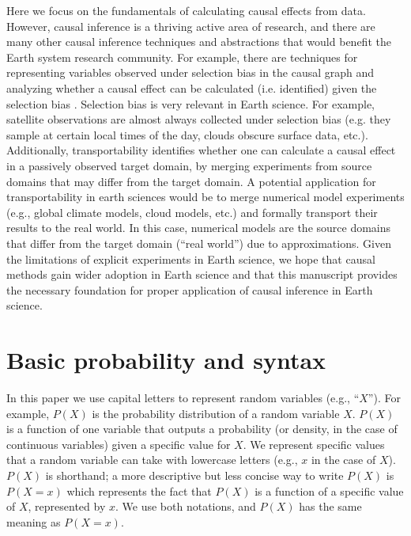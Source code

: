\documentclass[12pt]{article}
\begin{document}
Here we focus on the fundamentals of calculating causal effects from
data. However, causal inference is a thriving active area of research,
and there are many other causal inference techniques and abstractions
that would benefit the Earth system research community. For example,
there are techniques for representing variables observed under
selection bias in the causal graph and analyzing whether a causal
effect can be calculated (i.e. identified) given the selection bias
\citep[e.g.,][]{bareinboim2014recovering}. Selection bias is very
relevant in Earth science. For example, satellite observations are
almost always collected under selection bias (e.g. they sample at
certain local times of the day, clouds obscure surface data,
etc.). Additionally, transportability
\citep[e.g.,][]{bareinboim2012transportability} identifies whether one
can calculate a causal effect in a passively observed target domain,
by merging experiments from source domains that may differ from the
target domain. A potential application for transportability in earth
sciences would be to merge numerical model experiments (e.g., global
climate models, cloud models, etc.) and formally transport their
results to the real world. In this case, numerical models are the
source domains that differ from the target domain (``real world'') due
to approximations. Given the limitations of explicit experiments in
Earth science, we hope that causal methods gain wider adoption in
Earth science and that this manuscript provides the necessary
foundation for proper application of causal inference in Earth
science.





\appendix
\section{Basic probability and syntax}
\label{prob-theory}

In this paper we use capital letters to represent random variables
(e.g., ``$X$''). For example, $P(X)$ is the probability distribution
of a random variable $X$. $P(X)$ is a function of one variable that
outputs a probability (or density, in the case of continuous
variables) given a specific value for $X$. We represent specific
values that a random variable can take with lowercase letters (e.g.,
$x$ in the case of $X$). $P(X)$ is shorthand; a more descriptive but
less concise way to write $P(X)$ is $P(X=x)$ which represents the fact
that $P(X)$ is a function of a specific value of $X$, represented by
$x$. We use both notations, and $P(X)$ has the same meaning as
$P(X=x)$.
\end{document}
